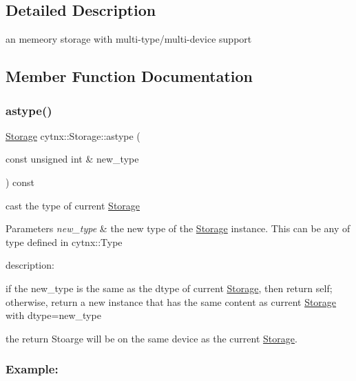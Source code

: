 \subsection{Detailed Description}
an memeory storage with multi-\/type/multi-\/device support 

\subsection{Member Function Documentation}
\mbox{\label{classcytnx_1_1Storage_a8310d8dbb70510272ded2e3d01be25f0}} 
\subsubsection{\texorpdfstring{astype()}{astype()}}
{\footnotesize\ttfamily \hyperlink{classcytnx_1_1Storage}{Storage} cytnx\+::\+Storage\+::astype (\begin{DoxyParamCaption}\item[{const unsigned int \&}]{new\+\_\+type }\end{DoxyParamCaption}) const\hspace{0.3cm}{\ttfamily [inline]}}



cast the type of current \hyperlink{classcytnx_1_1Storage}{Storage} 


\begin{DoxyParams}{Parameters}
{\em new\+\_\+type} & the new type of the \hyperlink{classcytnx_1_1Storage}{Storage} instance. This can be any of type defined in cytnx\+::\+Type\\
\hline
\end{DoxyParams}
description\+:
\begin{DoxyEnumerate}
\item if the new\+\_\+type is the same as the dtype of current \hyperlink{classcytnx_1_1Storage}{Storage}, then return self; otherwise, return a new instance that has the same content as current \hyperlink{classcytnx_1_1Storage}{Storage} with dtype=new\+\_\+type
\item the return Stoarge will be on the same device as the current \hyperlink{classcytnx_1_1Storage}{Storage}.
\end{DoxyEnumerate}

\subsubsection*{Example\+:}

